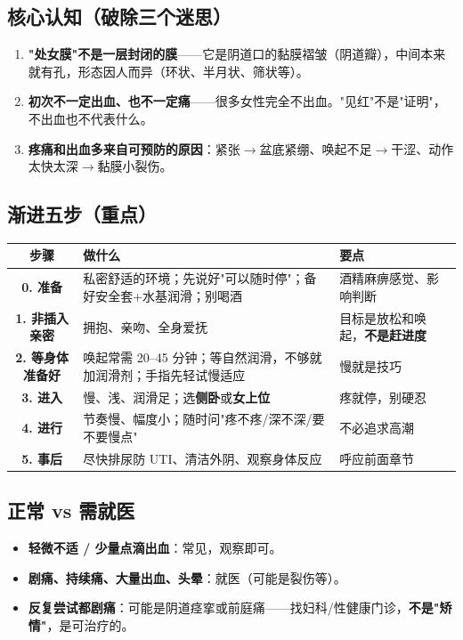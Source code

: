 \documentclass[12pt,UTF8,openany]{ctexbook}
\begin{document}
\subsection{核心认知（破除三个迷思）}

\begin{enumerate}[leftmargin=2em,itemsep=0.3em]
  \item \textbf{"处女膜"不是一层封闭的膜}——它是阴道口的黏膜褶皱（阴道瓣），中间本来就有孔，形态因人而异（环状、半月状、筛状等）。
  \item \textbf{初次不一定出血、也不一定痛}——很多女性完全不出血。"见红"不是"证明"，不出血也不代表什么。
  \item \textbf{疼痛和出血多来自可预防的原因}：紧张$\rightarrow$盆底紧绷、唤起不足$\rightarrow$干涩、动作太快太深$\rightarrow$黏膜小裂伤。
\end{enumerate}

\subsection{渐进五步（重点）}

\begin{tabularx}{\linewidth}{C X X}
\toprule
\textbf{步骤} & \textbf{做什么} & \textbf{要点} \\
\midrule
\textbf{0. 准备} & 私密舒适的环境；先说好"可以随时停"；备好安全套+水基润滑；别喝酒 & 酒精麻痹感觉、影响判断 \\
\textbf{1. 非插入亲密} & 拥抱、亲吻、全身爱抚 & 目标是放松和唤起，\textbf{不是赶进度} \\
\textbf{2. 等身体准备好} & 唤起常需 20--45 分钟；等自然润滑，不够就加润滑剂；手指先轻试慢适应 & 慢就是技巧 \\
\textbf{3. 进入} & 慢、浅、润滑足；选\textbf{侧卧}或\textbf{女上位} & 疼就停，别硬忍 \\
\textbf{4. 进行} & 节奏慢、幅度小；随时问"疼不疼/深不深/要不要慢点" & 不必追求高潮 \\
\textbf{5. 事后} & 尽快排尿防 UTI、清洁外阴、观察身体反应 & 呼应前面章节 \\
\bottomrule
\end{tabularx}

\subsection{正常 vs 需就医}

\begin{itemize}[leftmargin=2em,itemsep=0.3em]
  \item \textbf{轻微不适 / 少量点滴出血}：常见，观察即可。
  \item \textbf{剧痛、持续痛、大量出血、头晕}：就医（可能是裂伤等）。
  \item \textbf{反复尝试都剧痛}：可能是阴道痉挛或前庭痛——找妇科/性健康门诊，\textbf{不是"矫情"}，是可治疗的。
\end{itemize}
\end{document}

